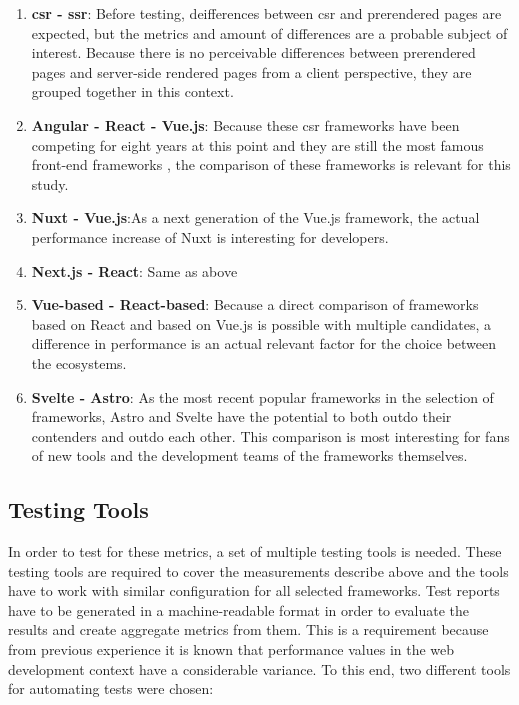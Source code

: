 \documentclass[a4paper, 10pt]{article}
\begin{document}
\begin{enumerate}
  \item \textbf{\acrshort{csr} - \acrshort{ssr}}: Before testing, deifferences between \acrshort{csr} and prerendered pages are expected, but the metrics and amount of differences are a probable subject of interest.
  Because there is no perceivable differences between prerendered  pages and server-side rendered pages from a client perspective, they are grouped together in this context.
  \item \textbf{Angular - React - Vue.js}: Because these \acrshort{csr} frameworks have been competing for eight years at this point and they are still the most famous front-end frameworks \citep{stateOfJs2023}, the comparison of these frameworks is relevant for this study.
  \item \textbf{Nuxt - Vue.js}:As a next generation of the Vue.js framework, the actual performance increase of Nuxt is interesting for developers.
  \item \textbf{Next.js - React}: Same as above
  \item \textbf{Vue-based - React-based}: Because a direct comparison of frameworks based on React and based on Vue.js is possible with multiple candidates, a difference in performance is an actual relevant factor for the choice between the ecosystems.
  \item \textbf{Svelte - Astro}: As the most recent popular frameworks in the selection of frameworks, Astro and Svelte have the potential to both outdo their contenders and outdo each other.
  This comparison is most interesting for fans of new tools and the development teams of the frameworks themselves.
\end{enumerate}

\subsection{Testing Tools}\label{subsec:testingtools}
% 
% 

In order to test for these metrics, a set of multiple testing tools is needed.
These testing tools are required to cover the measurements describe above and the tools have to work with similar configuration for all selected frameworks.
Test reports have to be generated in a machine-readable format in order to evaluate the results and create aggregate metrics from them.
This is a requirement because from previous experience it is known that performance values in the web development context have a considerable variance.
To this end, two different tools for automating tests were chosen:
\end{document}
